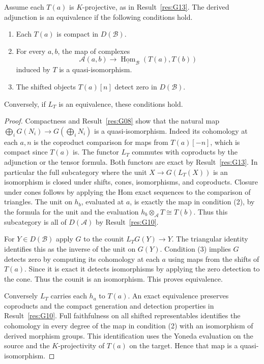 \begin{theorem}\label{res:G14}
Assume each \(T(a)\) is \(K\)-projective, as in
Result~\ref{res:G13}. The derived adjunction is an equivalence
if the following conditions hold.
\begin{enumerate}
\item Each \(T(a)\) is compact in \(D(\mathcal B)\).
\item For every \(a,b\), the map of complexes
\[
  \mathcal A(a,b)\longrightarrow
     \underline{\operatorname{Hom}}_\mathcal B(T(a),T(b))
\]
induced by \(T\) is a quasi-isomorphism.
\item The shifted objects \(T(a)[n]\) detect zero in \(D(\mathcal B)\).
\end{enumerate}
Conversely, if \(L_T\) is an equivalence, these conditions hold.
\end{theorem}
\begin{proof}
Compactness and Result~\ref{res:G08} show that the natural map
\(\bigoplus_i G(N_i)\to G(\bigoplus_i N_i)\) is a quasi-isomorphism.
Indeed its cohomology at each \(a,n\) is the coproduct comparison
for maps from \(T(a)[-n]\), which is compact since \(T(a)\) is.
The functor \(L_T\) commutes with coproducts by the adjunction
or the tensor formula. Both functors are exact by
Result~\ref{res:G13}. In particular the full subcategory where
the unit \(X\to G(L_T(X))\) is an isomorphism is closed under
shifts, cones, isomorphisms, and coproducts. Closure under cones
follows by applying the Hom exact sequences to the comparison
of triangles. The unit on \(h_b\), evaluated at \(a\), is
exactly the map in condition (2), by the formula for the unit and
the evaluation \(h_b\otimes_\mathcal A T\cong T(b)\).
Thus this subcategory is all of \(D(\mathcal A)\) by
Result~\ref{res:G10}.

For \(Y\in D(\mathcal B)\) apply \(G\) to the counit
\(L_T G(Y)\to Y\). The triangular identity identifies this as
the inverse of the unit on \(G(Y)\). Condition (3) implies \(G\)
detects zero by computing its cohomology at each \(a\) using
maps from the shifts of \(T(a)\). Since it is exact it detects
isomorphisms by applying the zero detection to the cone.
Thus the counit is an isomorphism. This proves equivalence.

Conversely \(L_T\) carries each \(h_a\) to \(T(a)\).
An exact equivalence preserves coproducts and the compact
generation and detection properties in Result~\ref{res:G10}.
Full faithfulness on all shifted representables identifies the
cohomology in every degree of the map in condition (2) with
an isomorphism of derived morphism groups. This identification
uses the Yoneda evaluation on the source and the
\(K\)-projectivity of \(T(a)\) on the target. Hence that map is
a quasi-isomorphism.
\end{proof}

